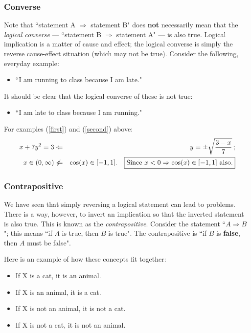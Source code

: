 \subsubsection*{Converse}
Note that ``statement A $\Rightarrow$ statement B" does {\bf not}
necessarily mean that the {\em logical converse} --- ``statement B
$\Rightarrow$ statement A" --- is also true.  Logical implication is a
matter of cause and effect; the logical converse is simply the reverse
cause-effect situation (which may not be true).
Consider the following, everyday example:
\begin{itemize}
\item ``I am running to class because I am late."
\end{itemize}
It should be clear that the logical converse of these is not true:
\begin{itemize}
\item ``I am late to class because I am running."
\end{itemize}

For examples (\ref{first}) and (\ref{second}) above:
\begin{eqnarray*}
x + 7y^2 = 3 & \Leftarrow & y = \pm \sqrt{\frac{3-x}{7}} \, ; \\
x \in (0,\infty) & \not\Leftarrow & \cos(x) \in [-1,1]. \quad
	\fbox{Since $x<0 \Rightarrow \cos(x) \in [-1,1]$ also.}
\end{eqnarray*}


\subsubsection*{Contrapositive}
We have seen that simply reversing a logical statement can lead to problems.
There is a way, however, to invert an implication so that the inverted
statement is also true.  This is known as the {\em contrapositive}.
Consider the statement ``$A \Rightarrow B$"; this means ``if $A$ is
true, then $B$ is true".  The contrapositive is ``if $B$ is {\bf false},
then $A$ must be false".  

Here is an example of how these concepts fit together:
\begin{itemize}
\item If X is a cat, it is an animal.  
\item If X is an animal, it is a cat.  
\item If X is not an animal, it is not a cat.  
\item If X is not a cat, it is not an animal.\\
\end{itemize}

